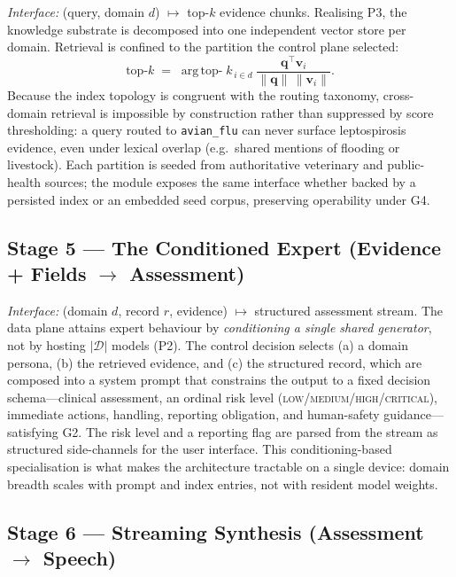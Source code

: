 \documentclass[runningheads]{llncs}
\begin{document}
\emph{Interface:} (query, domain $d$) $\mapsto$ top-$k$ evidence chunks.
Realising P3, the knowledge substrate is decomposed into one independent vector store per domain. Retrieval is confined to the partition the control plane selected:
\begin{equation}
\mathrm{top\text{-}}k \;=\; \operatorname*{arg\,top\text{-}}k_{\,i\in d}\;\frac{\mathbf{q}^{\top}\mathbf{v}_i}{\lVert\mathbf{q}\rVert\,\lVert\mathbf{v}_i\rVert}.
\end{equation}
Because the index topology is congruent with the routing taxonomy, cross-domain retrieval is impossible by construction rather than suppressed by score thresholding: a query routed to \texttt{avian\_flu} can never surface leptospirosis evidence, even under lexical overlap (e.g.\ shared mentions of flooding or livestock). Each partition is seeded from authoritative veterinary and public-health sources; the module exposes the same interface whether backed by a persisted index or an embedded seed corpus, preserving operability under G4.

\subsection{Stage 5 --- The Conditioned Expert (Evidence + Fields $\rightarrow$ Assessment)}
\label{sec:expert}

\emph{Interface:} (domain $d$, record $r$, evidence) $\mapsto$ structured assessment stream.
The data plane attains expert behaviour by \emph{conditioning a single shared generator}, not by hosting $|\mathcal{D}|$ models (P2). The control decision selects (a) a domain persona, (b) the retrieved evidence, and (c) the structured record, which are composed into a system prompt that constrains the output to a fixed decision schema---clinical assessment, an ordinal risk level (\textsc{low}/\textsc{medium}/\textsc{high}/\textsc{critical}), immediate actions, handling, reporting obligation, and human-safety guidance---satisfying G2. The risk level and a reporting flag are parsed from the stream as structured side-channels for the user interface. This conditioning-based specialisation is what makes the architecture tractable on a single device: domain breadth scales with prompt and index entries, not with resident model weights.

\subsection{Stage 6 --- Streaming Synthesis (Assessment $\rightarrow$ Speech)}
\end{document}
